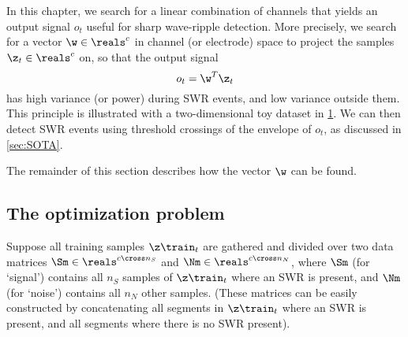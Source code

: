 \label{sec:GEVD-optim}

In this chapter, we search for a linear combination of channels that yields an output signal $o_t$ useful for sharp wave-ripple detection. More precisely, we search for a vector $\w \in \reals^c$ in channel (or electrode) space to project the samples $\z_t \in \reals^c$ on, so that the output signal
%
\begin{equation}
\label{eq:linear}
o_t = \w^T \z_t
\end{equation}
%
has high variance (or power) during SWR events, and low variance outside them. This principle is illustrated with a two-dimensional toy dataset in \cref{fig:GEVec_principle}. We can then detect SWR events using threshold crossings of the envelope of $o_t$, as discussed in \cref{sec:SOTA}.

\begin{figure}
\label{fig:GEVec_principle}
\end{figure}

The remainder of this section describes how the vector $\w$ can be found.



\subsection{The optimization problem}

Suppose all training samples $\z\train_t$ are gathered and divided over two data matrices $\Sm \in \reals^{c \cross n_S}$ and $\Nm \in \reals^{c \cross n_N}$, where $\Sm$ (for `signal') contains all $n_S$ samples of $\z\train_t$ where an SWR is present, and $\Nm$ (for `noise') contains all $n_N$ other samples. (These matrices can be easily constructed by concatenating all segments in $\z\train_t$ where an SWR is present, and all segments where there is no SWR present).

